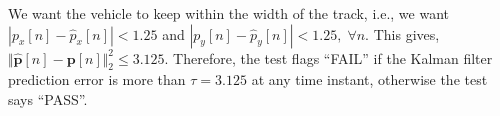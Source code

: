\documentclass[11pt]{article}
\begin{document}
We want the vehicle to keep within the width of the track, i.e., we want $|p_{x}[n] - \hat{p}_{x}[n]|<1.25$ and $|p_{y}[n] - \hat{p}_{y}[n]|<1.25, \; \forall n$. This gives, $\Vert \hat{\mathbf{p}}[n] - \mathbf{p}[n] \Vert_{2}^{2} \leq 3.125$. Therefore, the test flags ``FAIL'' if the Kalman filter prediction error is more than $\tau = 3.125$ at any time instant, otherwise the test says ``PASS''.
\begin{figure}[!h]
\centering
{}



\end{figure}
\end{document}
